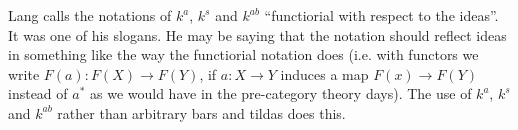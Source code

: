 \begin{bergman}
    Lang calls the notations of $k^a$, $k^s$ and $k^{ab}$ ``functiorial with respect to the ideas''. It was one of his slogans. He may be saying that the notation should reflect ideas in something like the way the functiorial notation does (i.e. with functors we write $F(a)\colon F(X)\rightarrow F(Y)$, if $a\colon X\rightarrow Y$ induces a map $F(x)\rightarrow F(Y)$ instead of $a^\ast$ as we would have in the pre-category theory days). 
    The use of $k^a$, $k^s$ and $k^{ab}$ rather than arbitrary bars and tildas does this.
\end{bergman}
